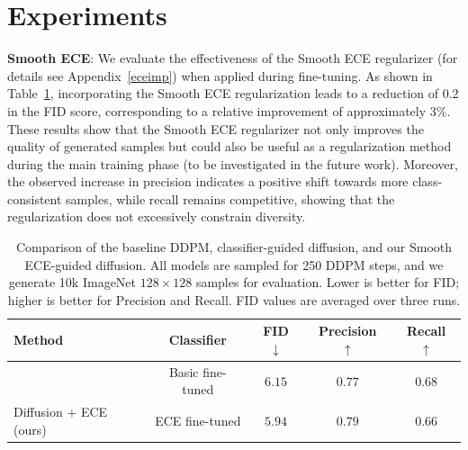\documentclass{article}
\begin{document}
\section{Experiments} \label{exp}



\textbf{Smooth ECE}: We evaluate the effectiveness of the Smooth ECE regularizer (for details see Appendix~\ref{eceimp}) when applied during fine-tuning. As shown in Table~\ref{tab:ece}, incorporating the Smooth ECE regularization leads to a reduction of 0.2 in the FID score, corresponding to a relative improvement of approximately 3\%. These results show that the Smooth ECE regularizer not only improves the quality of generated samples but could also be useful as a regularization method during the main training phase (to be investigated in the future work). Moreover, the observed increase in precision indicates a positive shift towards more class-consistent samples, while recall remains competitive, showing that the regularization does not excessively constrain diversity.




\begin{table}[h]
  \centering
  \vspace{-1em}
  \caption{Comparison of the baseline DDPM, classifier-guided diffusion, and our Smooth ECE-guided diffusion. All models are sampled for 250 DDPM steps, and we generate 10k ImageNet $128\times128$ samples for evaluation. Lower is better for FID; higher is better for Precision and Recall. FID values are averaged over three runs.}
  \vspace{5pt}
  \label{tab:ece}
  \begin{tabular}{lcccc}
    \toprule
    \textbf{Method} & \textbf{Classifier} & \textbf{FID} $\downarrow$ & \textbf{Precision} $\uparrow$ & \textbf{Recall} $\uparrow$ \\
    \midrule
    \cite{dhariwal2021diffusion}   & Basic fine-tuned          & $6.15$ & $0.77$ & $\mathbf{0.68}$ \\
    Diffusion + ECE (ours)         & ECE fine-tuned            & $\mathbf{5.94}$ & $\mathbf{0.79}$ & $0.66$ \\
    \bottomrule
  \end{tabular}
\end{table}
\end{document}
